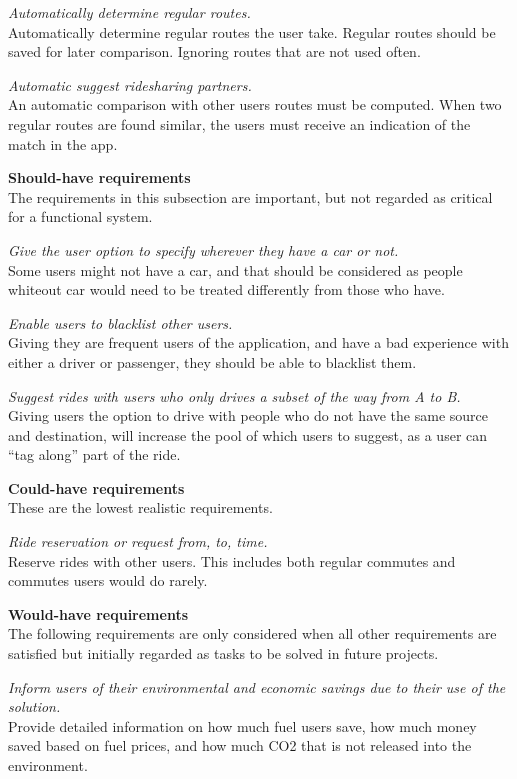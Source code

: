 \textit{Automatically determine regular routes.}\\
Automatically determine regular routes the user take. 
Regular routes should be saved for later comparison. 
Ignoring routes that are not used often.

\textit{Automatic suggest ridesharing partners.}\\
An automatic comparison with other users routes must be computed.
When two regular routes are found similar, the users must receive an indication of the match in the app.


\textbf{Should-have requirements}\\
The requirements in this subsection are important, but not regarded as critical for a functional system.

\textit{Give the user option to specify wherever they have a car or not.}\\
Some users might not have a car, and that should be considered as people whiteout car would need to be treated differently from those who have.

\textit{Enable users to blacklist other users.}\\
Giving they are frequent users of the application, and have a bad experience with either a driver or passenger, they should be able to blacklist them.

\textit{Suggest rides with users who only drives a subset of the way from A to B.}\\
Giving users the option to drive with people who do not have the same source and destination, will increase the pool of which users to suggest, as a user can ``tag along'' part of the ride.


\textbf{Could-have requirements}\\
These are the lowest realistic requirements. 

\textit{Ride reservation or request from, to, time.}\\
Reserve rides with other users. 
This includes both regular commutes and commutes users would do rarely.

\textbf{Would-have requirements}\\
The following requirements are only considered when all other requirements are satisfied but initially regarded as tasks to be solved in future projects.

\textit{Inform users of their environmental and economic savings due to their use of the solution.}\\
Provide detailed information on how much fuel users save, how much money saved based on fuel prices, and how much CO2 that is not released into the environment. 

